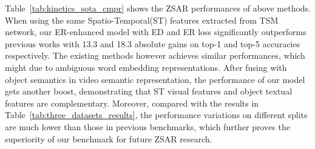Table~\ref{tab:kinetics_sota_cmpr} shows the ZSAR performances of above methods.
When using the same Spatio-Temporal(ST) features extracted from TSM network, our ER-enhanced model with ED and ER loss significantly outperforms previous works with 13.3 and 18.3 absolute gains on top-1 and top-5 accuracies respectively.
The existing methods however achieves similar performances, which might due to ambiguous word embedding representations.
After fusing with object semantics in video semantic representation, the performance of our model gets another boost, demonstrating that ST visual features and object textual features are complementary.
Moreover, compared with the results in Table~\ref{tab:three_datasets_results}, the performance variations on different splits are much lower than those in previous benchmarks, which further proves the superiority of our benchmark for future ZSAR research.

